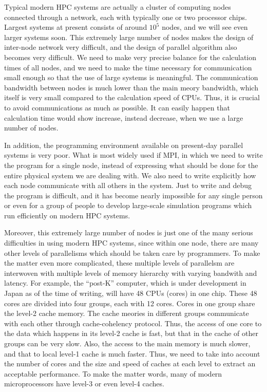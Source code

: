 \documentclass[]{pasj01}
\begin{document}
Typical modern HPC systems are actually a cluster of computing nodes
connected through a network, each with typically one or two processor
chips. Largest systems at present consists of around $10^5$ nodes, and
we will see even larger systems soon. This extremely large number of
nodes makes the design of inter-node network very difficult, and the
design of parallel algorithm also becomes very difficult. We need to
make very precise balance for the calculation times of all nodes, and
we need to make the time necessary for communication small enough so
that the use of large systems is meaningful. The communication
bandwidth between nodes is much lower than the main meory bandwidth,
which itself is very small compared to the calculation speed of
CPUs. Thus, it is crucial to avoid communications as much as possible.
It can easily happen that calculation time would show increase,
instead decrease, when we use a large number of nodes.

In addition, the programming environment available on present-day
parallel systems is very poor. What is most widely used if MPI, in
which we need to write the program for a single node, instead of
expressing what should be done for the entire physical system we are
dealing with. We also need to write explicitly how each node
communicate with all others in the system. Just to write and debug the
program is difficult, and it has become nearly impossible for any
single person or even for a group of people to develop large-scale
simulation programs which run efficiently on modern HPC systems.

Moreover, this extremely large number of nodes is just one of the many
serious difficulties in using modern HPC systems, since within one
node, there are many other levels of parallelisms which should be
taken care by programmers. To make the matter even more complicated,
these multiple levels of parallelsm are interwoven with multiple
levels of memory hierarchy with varying bandwith and latency. For
example, the ``post-K'' computer, which is under development in Japan
as of the time of writing, will have 48 CPUs (cores) in one
chip. These 48 cores are divided into four groups, each with 12
cores. Cores in one group share the level-2 cache memory. The cache
meories in different groups communicate with each other through
cache-cohelency protocol. Thus, the access of one core to the data
which happens in its level-2 cache is fast, but that in the cache of
other groups can be very slow. Also, the access to the main memory is
much slower, and that to local level-1 cache is much faster. Thus, we
need to take into account the number of cores and the size and speed
of caches at each level to extract an acceptable performance. To make
the matter words, many of
modern microprocessors have level-3 or even level-4 caches.
\end{document}
